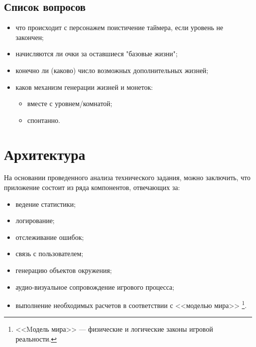 \documentclass[12pt,a4paper,fullpage,titlepage]{article}
\begin{document}
\subsection{Список вопросов}
\begin{itemize}
	\item что происходит с персонажем поистичение таймера, если уровень не закончен;
	\item начисляются ли очки за оставшиеся "базовые жизни";
	\item конечно ли (каково) число возможных дополнительных жизней;
	\item каков механизм генерации жизней и монеток:
	\begin{itemize}
		\item вместе с уровнем/комнатой;
		\item спонтанно.
	\end{itemize}
\end{itemize}


\newpage
\section{Архитектура}
На основании проведенного анализа технического задания, можно заключить, что приложение состоит из ряда компонентов, отвечающих за:
\begin{itemize}	
	\item ведение статистики;	
	\item логирование;	
	\item отслеживание ошибок;	
	\item связь с пользователем;	
	\item генерацию объектов окружения;	
	\item аудио-визуальное сопровождение игрового процесса;
	\item выполнение необходимых расчетов в соответствии с <<моделью мира>> \footnote{<<Mодель мира>> --- физические и логические законы игровой реальности.}.\\
\end{itemize}
\end{document}
